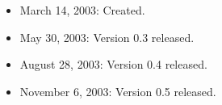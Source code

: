 \documentclass[11pt]{article}
\begin{document}
\begin{itemize}

  \item March 14, 2003: Created.
  \item May 30, 2003: Version 0.3 released.
  \item August 28, 2003: Version 0.4 released.
  \item November 6, 2003: Version 0.5 released.

\end{itemize}




\end{document}
